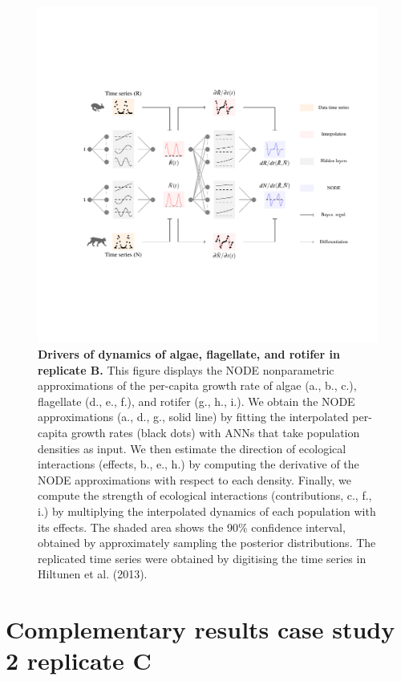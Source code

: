 \documentclass[11pt, oneside]{article}
\begin{document}
\newpage
\begin{figure}[H]
\includegraphics[width=1\linewidth,page=12]{figures/main.pdf}
\caption{
    \textbf{Drivers of dynamics of algae, flagellate, and rotifer in replicate B.}
    This figure displays the NODE nonparametric approximations of the per-capita growth rate of algae (a., b., c.), flagellate (d., e., f.), and rotifer (g., h., i.).
    We obtain the NODE approximations (a., d., g., solid line) by fitting the interpolated per-capita growth rates (black dots) with ANNs that take population densities as input.
    We then estimate the direction of ecological interactions (effects, b., e., h.) by computing the derivative of the NODE approximations with respect to each density.
    Finally, we compute the strength of ecological interactions (contributions, c., f., i.) by multiplying the interpolated dynamics of each population with its effects.
    The shaded area shows the 90\% confidence interval, obtained by approximately sampling the posterior distributions. 
    The replicated time series were obtained by digitising the time series in Hiltunen et al. (2013).
}
\end{figure}
\newpage

\section{Complementary results case study 2 replicate C}
\end{document}
